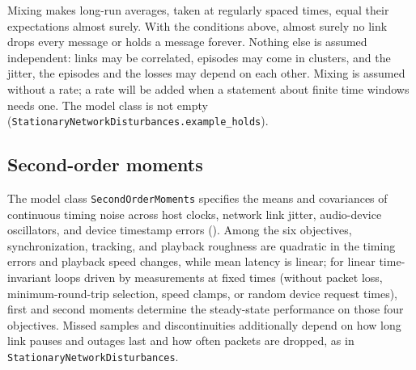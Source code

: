 \documentclass[11pt,a4paper]{article}
\newcommand{\lean}[1]{\texttt{#1}}
\theoremstyle{definition}
\begin{document}
Mixing makes long-run averages, taken at regularly spaced times, equal their
expectations almost surely. With the conditions above, almost surely no
link drops every message or holds a message forever. Nothing else is
assumed independent: links may be correlated, episodes may come in
clusters, and the jitter, the episodes and the losses may depend on each
other. Mixing is assumed without a rate; a rate will be added when a
statement about finite time windows needs one. The model class is not empty
(\lean{StationaryNetworkDisturbances.\allowbreak example\_\allowbreak holds}).

\subsection{Second-order moments}

The model class \lean{SecondOrderMoments} specifies the means and
covariances of continuous timing noise across host clocks, network link
jitter, audio-device oscillators, and device timestamp errors
(). Among the six
objectives, synchronization, tracking, and playback roughness are quadratic
in the timing errors and playback speed changes, while mean latency is
linear; for linear time-invariant loops driven by measurements at fixed
times (without packet loss, minimum-round-trip selection, speed clamps, or
random device request times), first and second moments determine the
steady-state performance on those four objectives. Missed samples and
discontinuities additionally depend on how long link pauses and outages last
and how often packets are dropped, as in
\lean{StationaryNetworkDisturbances}.
\end{document}
